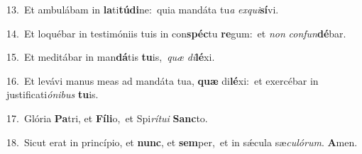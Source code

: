 {\numbfont\textcolor{\numbcolor}{13.}}~Et ambulábam in \textbf{la}\-ti\-\textbf{tú}\-\textbf{di}ne:~\star quia mandáta tu\textit{a} \textit{ex}\-\textit{qui}\textbf{sí}vi.\par
{\numbfont\textcolor{\numbcolor}{14.}}~Et loquébar in testimóniis tuis in con\-\textbf{spéc}\-tu \textbf{re}\-gum:~\star et \textit{non} \textit{con}\-\textit{fun}\textbf{dé}bar.\par
{\numbfont\textcolor{\numbcolor}{15.}}~Et meditábar in man\-\textbf{dá}\-tis \textbf{tu}\-is,~\star \textit{quæ} \textit{di}\-\textbf{lé}xi.\par
{\numbfont\textcolor{\numbcolor}{16.}}~Et levávi manus meas ad mandáta tua, \textbf{quæ} di\-\textbf{lé}\-xi:~\star et exercébar in justificati\-\textit{ó}\-\textit{ni}\textit{bus} \textbf{tu}\-is.\par
{\numbfont\textcolor{\numbcolor}{17.}}~Glória \textbf{Pa}\-tri, et \textbf{Fí}\-\textbf{li}o,~\star et Spi\-\textit{rí}\-\textit{tu}\textit{i} \textbf{Sanc}\-to.\par
{\numbfont\textcolor{\numbcolor}{18.}}~Sicut erat in princípio, et \textbf{nunc}\-, et \textbf{sem}\-per,~\star et in sǽcula sæ\-\textit{cu}\-\textit{ló}\textit{rum}. \textbf{A}\-men.\par
